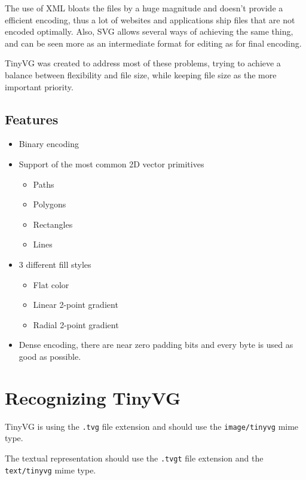 \documentclass[]{article}
\providecommand{\tightlist}{%
  \setlength{\itemsep}{0pt}\setlength{\parskip}{0pt}}
\begin{document}
The use of XML bloats the files by a huge magnitude and doesn't provide
a efficient encoding, thus a lot of websites and applications ship files
that are not encoded optimally. Also, SVG allows several ways of
achieving the same thing, and can be seen more as an intermediate format
for editing as for final encoding.

TinyVG was created to address most of these problems, trying to achieve a
balance between flexibility and file size, while keeping file size as
the more important priority.

\hypertarget{features}{\subsection{Features}\label{features}}

\begin{itemize}
\tightlist
\item Binary encoding
\item
  Support of the most common 2D vector primitives
  \begin{itemize}
  \tightlist
  \item Paths
  \item Polygons
  \item Rectangles
  \item Lines
  \end{itemize}
\item
  3 different fill styles
  \begin{itemize}
  \tightlist
  \item Flat color
  \item Linear 2-point gradient
  \item Radial 2-point gradient
  \end{itemize}
\item Dense encoding, there are near zero padding bits and every byte is used as good as possible.
\end{itemize}

\hypertarget{recognition}{\section{Recognizing TinyVG}\label{recognition}}

TinyVG is using the \texttt{.tvg} file extension and should use the \texttt{image/tinyvg} mime type.

The textual representation should use the \texttt{.tvgt} file extension and the \texttt{text/tinyvg} mime type.
\end{document}
